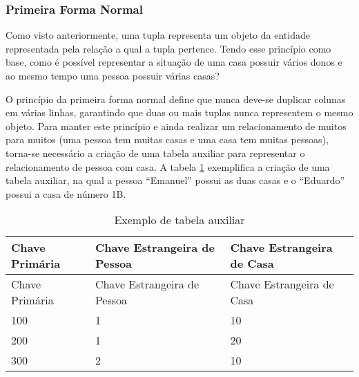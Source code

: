 

\subsubsection{Primeira Forma Normal}
    
Como visto anteriormente, uma tupla representa um objeto da entidade representada pela relação a qual a tupla pertence. Tendo esse princípio como base, como é possível representar a situação de uma casa possuir vários donos e ao mesmo tempo uma pessoa possuir várias casas?
    
O princípio da primeira forma normal define que nunca deve-se duplicar colunas em várias linhas, garantindo que duas ou mais tuplas nunca representem o mesmo objeto. Para manter este princípio e ainda realizar um relacionamento de muitos para muitos (uma pessoa tem muitas casas e uma casa tem muitas pessoas), torna-se necessário a criação de uma tabela auxiliar para representar o relacionamento de pessoa com casa. A tabela \ref{tab: relacionamento-pessoa-casa} exemplifica a criação de uma tabela auxiliar, na qual a pessoa ``Emanuel'' possui as duas casas e o ``Eduardo'' possui a casa de número 1B.

\begin{longtable}[]{@{}lll@{}}
\caption{Exemplo de tabela auxiliar \label{tab: relacionamento-pessoa-casa}}\tabularnewline
\toprule
Chave Primária & Chave Estrangeira de Pessoa & Chave Estrangeira de Casa\tabularnewline
\midrule
\endfirsthead
\toprule
Chave Primária & Chave Estrangeira de Pessoa & Chave Estrangeira de Casa\tabularnewline
\midrule
\endhead
100 & 1 & 10\tabularnewline
200 & 1 & 20\tabularnewline
300 & 2 & 10\tabularnewline
\bottomrule
\end{longtable}


